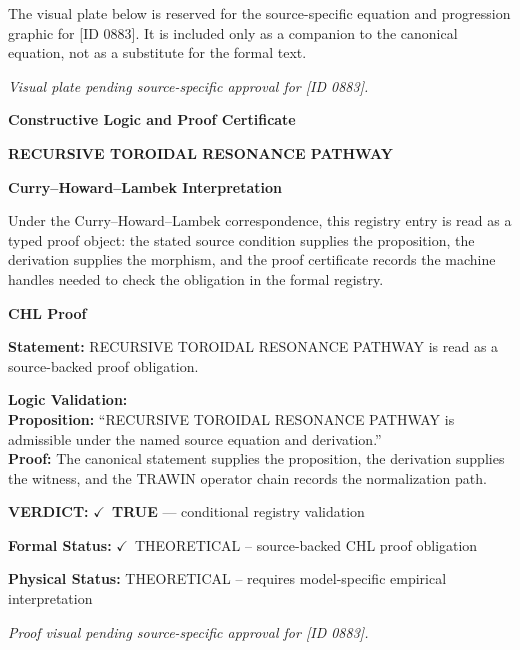 \begingroup\footnotesize\sloppy
The visual plate below is reserved for the source-specific equation and progression graphic for [ID 0883]. It is included only as a companion to the canonical equation, not as a substitute for the formal text.
\par\endgroup
\begingroup\footnotesize\itshape
Visual plate pending source-specific approval for [ID 0883].
\par\endgroup

\clearpage
\begingroup\tzpsupportsetup
\noindent\textbf{\fontsize{10.8pt}{12.8pt}\selectfont [ID 0883] Constructive Logic and Proof Certificate}\par
\noindent\textbf{\fontsize{10pt}{12pt}\selectfont RECURSIVE TOROIDAL RESONANCE PATHWAY}\par
\vspace{0.45em}
\begingroup
\footnotesize
\setlength{\parskip}{0.22em}
\setlength{\parindent}{0pt}
\noindent\textbf{Curry--Howard--Lambek Interpretation}\par
Under the Curry--Howard--Lambek correspondence, this registry entry is read as a typed proof
object: the stated source condition supplies the proposition, the derivation supplies the
morphism, and the proof certificate records the machine handles needed to check the obligation
in the formal registry.

\vspace{0.45em}
\noindent\textbf{CHL Proof}\par
\textbf{Statement:} RECURSIVE TOROIDAL RESONANCE PATHWAY is read as a source-backed proof obligation.

\textbf{Logic Validation:}\\
\textbf{Proposition:} ``RECURSIVE TOROIDAL RESONANCE PATHWAY is admissible under the named source equation and derivation.''\\
\textbf{Proof:} The canonical statement supplies the proposition, the derivation supplies the witness, and the TRAWIN operator chain records the normalization path.

\textbf{VERDICT:} \ensuremath{\checkmark}\ \textbf{TRUE} --- conditional registry validation

\textbf{Formal Status:} \ensuremath{\checkmark}\ THEORETICAL -- source-backed CHL proof obligation

\textbf{Physical Status:} THEORETICAL -- requires model-specific empirical interpretation
\par\vspace{0.45em}
\par
\vfill
\begingroup\footnotesize\itshape
Proof visual pending source-specific approval for [ID 0883].
\par\endgroup
\vfill
\endgroup
\endgroup

